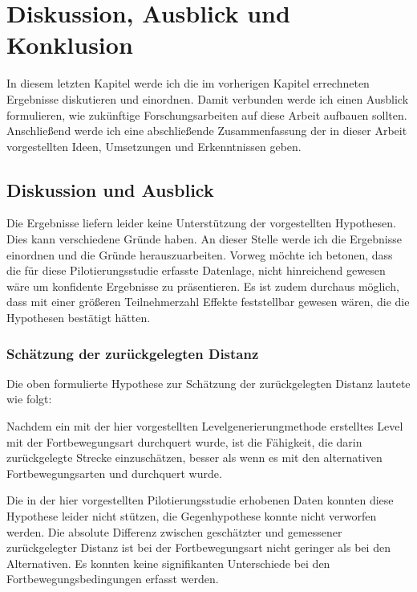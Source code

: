 

\chapter{Diskussion, Ausblick und Konklusion}\label{chapter:discussion-conclusion}
    In diesem letzten Kapitel werde ich die im vorherigen Kapitel errechneten Ergebnisse diskutieren und einordnen. Damit verbunden werde ich einen Ausblick formulieren, wie zukünftige Forschungsarbeiten auf diese Arbeit aufbauen sollten. Anschließend werde ich eine abschließende Zusammenfassung der in dieser Arbeit vorgestellten Ideen, Umsetzungen und Erkenntnissen geben.

    \section{Diskussion und Ausblick}
        Die Ergebnisse liefern leider keine Unterstützung der vorgestellten Hypothesen. Dies kann verschiedene Gründe haben. An dieser Stelle werde ich die Ergebnisse einordnen und die Gründe herauszuarbeiten.
        Vorweg möchte ich betonen, dass die für diese Pilotierungsstudie erfasste Datenlage, nicht hinreichend gewesen wäre um konfidente Ergebnisse zu präsentieren. Es ist zudem durchaus möglich, dass mit einer größeren Teilnehmerzahl Effekte feststellbar gewesen wären, die die Hypothesen bestätigt hätten.

        \subsection{Schätzung der zurückgelegten Distanz}
            Die oben formulierte Hypothese zur Schätzung der zurückgelegten Distanz lautete wie folgt:

            Nachdem ein mit der hier vorgestellten Levelgenerierungmethode erstelltes Level mit der Fortbewegungsart  durchquert wurde, ist die Fähigkeit, die darin zurückgelegte Strecke einzuschätzen, besser als wenn es mit den alternativen Fortbewegungsarten  und  durchquert wurde.

            Die in der hier vorgestellten Pilotierungsstudie erhobenen Daten konnten diese Hypothese leider nicht stützen, die Gegenhypothese konnte nicht verworfen werden. Die absolute Differenz zwischen geschätzter und gemessener zurückgelegter Distanz ist bei der Fortbewegungsart  nicht geringer als bei den Alternativen. Es konnten keine signifikanten Unterschiede bei den Fortbewegungsbedingungen erfasst werden.

